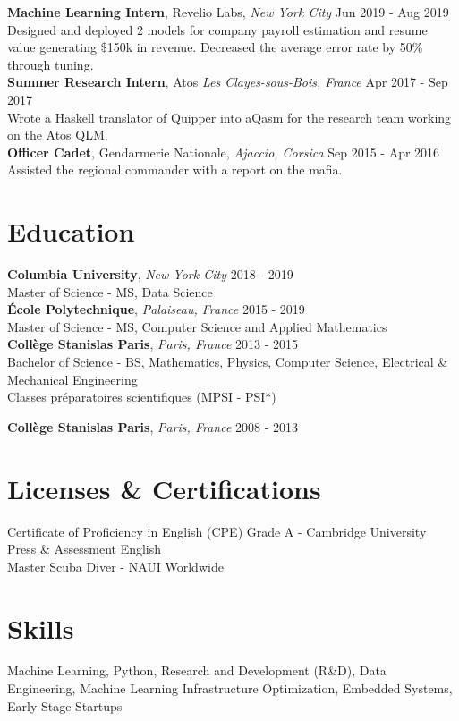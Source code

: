 \documentclass[a4paper,10pt]{article}
\begin{document}
    \noindent\textbf{Machine Learning Intern}, Revelio Labs, \textit{New York City} \hfill Jun 2019 - Aug 2019\\
    Designed and deployed 2 models for company payroll estimation and resume value generating \$150k in revenue. Decreased the average error rate by 50\% through tuning.\\

    \noindent\textbf{Summer Research Intern}, Atos \textit{Les Clayes-sous-Bois, France} \hfill Apr 2017 - Sep 2017\\
    Wrote a Haskell translator of Quipper into aQasm for the research team working on the Atos QLM.\\

    \noindent\textbf{Officer Cadet}, Gendarmerie Nationale, \textit{Ajaccio, Corsica} \hfill Sep 2015 - Apr 2016\\
    Assisted the regional commander with a report on the mafia.

    \section*{Education}

    \noindent\textbf{Columbia University}, \textit{New York City} \hfill 2018 - 2019\\
    Master of Science - MS, Data Science\\

    \noindent\textbf{École Polytechnique}, \textit{Palaiseau, France} \hfill 2015 - 2019\\
    Master of Science - MS, Computer Science and Applied Mathematics\\

    \noindent\textbf{Collège Stanislas Paris}, \textit{Paris, France} \hfill 2013 - 2015\\
    Bachelor of Science - BS, Mathematics, Physics, Computer Science, Electrical \& Mechanical Engineering\\
    Classes préparatoires scientifiques (MPSI - PSI*)

    \noindent\textbf{Collège Stanislas Paris}, \textit{Paris, France} \hfill 2008 - 2013\\

    \section*{Licenses \& Certifications}
    Certificate of Proficiency in English (CPE) Grade A - Cambridge University Press \& Assessment English \hfill \\
    Master Scuba Diver - NAUI Worldwide \hfill

    \section*{Skills}
    Machine Learning, Python, Research and Development (R\&D), Data Engineering, Machine Learning Infrastructure Optimization, Embedded Systems, Early-Stage Startups
\end{document}
